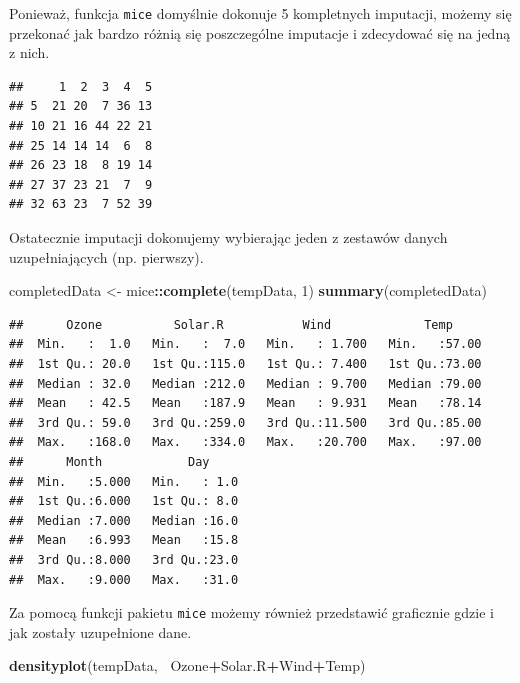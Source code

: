 \documentclass[]{book}
\newenvironment{Shaded}{\begin{snugshade}}{\end{snugshade}}
\newcommand{\DecValTok}[1]{\textcolor[rgb]{0.00,0.00,0.81}{#1}}
\newcommand{\KeywordTok}[1]{\textcolor[rgb]{0.13,0.29,0.53}{\textbf{#1}}}
\newcommand{\NormalTok}[1]{#1}
\newcommand{\OperatorTok}[1]{\textcolor[rgb]{0.81,0.36,0.00}{\textbf{#1}}}
\newcommand{\StringTok}[1]{\textcolor[rgb]{0.31,0.60,0.02}{#1}}
\theoremstyle{plain}
\theoremstyle{definition}
\begin{document}
Ponieważ, funkcja \texttt{mice} domyślnie dokonuje 5 kompletnych imputacji, możemy się przekonać jak bardzo różnią się poszczególne imputacje i zdecydować się na jedną z nich.

\begin{Shaded}
\end{Shaded}

\begin{verbatim}
##     1  2  3  4  5
## 5  21 20  7 36 13
## 10 21 16 44 22 21
## 25 14 14 14  6  8
## 26 23 18  8 19 14
## 27 37 23 21  7  9
## 32 63 23  7 52 39
\end{verbatim}

Ostatecznie imputacji dokonujemy wybierając jeden z zestawów danych uzupełniających (np. pierwszy).

\begin{Shaded}
\begin{Highlighting}[]
\NormalTok{completedData <-}\StringTok{ }\NormalTok{mice}\OperatorTok{::}\KeywordTok{complete}\NormalTok{(tempData, }\DecValTok{1}\NormalTok{)}
\KeywordTok{summary}\NormalTok{(completedData)}
\end{Highlighting}
\end{Shaded}

\begin{verbatim}
##      Ozone          Solar.R           Wind             Temp      
##  Min.   :  1.0   Min.   :  7.0   Min.   : 1.700   Min.   :57.00  
##  1st Qu.: 20.0   1st Qu.:115.0   1st Qu.: 7.400   1st Qu.:73.00  
##  Median : 32.0   Median :212.0   Median : 9.700   Median :79.00  
##  Mean   : 42.5   Mean   :187.9   Mean   : 9.931   Mean   :78.14  
##  3rd Qu.: 59.0   3rd Qu.:259.0   3rd Qu.:11.500   3rd Qu.:85.00  
##  Max.   :168.0   Max.   :334.0   Max.   :20.700   Max.   :97.00  
##      Month            Day      
##  Min.   :5.000   Min.   : 1.0  
##  1st Qu.:6.000   1st Qu.: 8.0  
##  Median :7.000   Median :16.0  
##  Mean   :6.993   Mean   :15.8  
##  3rd Qu.:8.000   3rd Qu.:23.0  
##  Max.   :9.000   Max.   :31.0
\end{verbatim}

Za pomocą funkcji pakietu \texttt{mice} możemy również przedstawić graficznie gdzie i jak zostały uzupełnione dane.

\begin{Shaded}
\begin{Highlighting}[]
\KeywordTok{densityplot}\NormalTok{(tempData, }\OperatorTok{~}\NormalTok{Ozone}\OperatorTok{+}\NormalTok{Solar.R}\OperatorTok{+}\NormalTok{Wind}\OperatorTok{+}\NormalTok{Temp)}
\end{Highlighting}
\end{Shaded}
\end{document}
